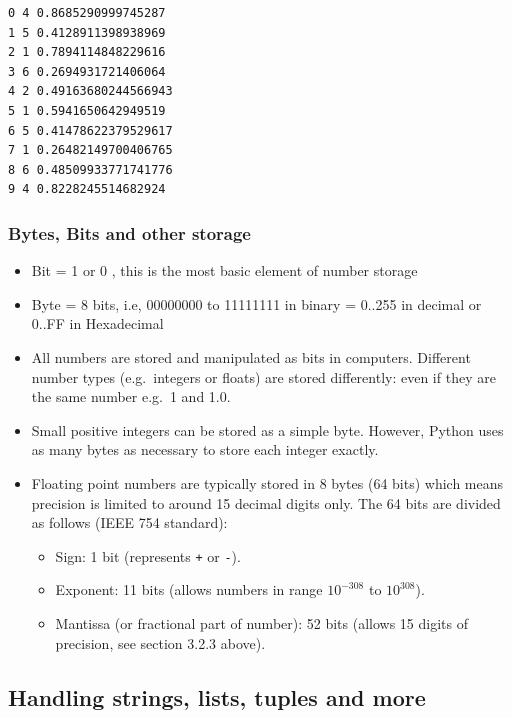 \documentclass[10pt]{article}
\providecommand{\tightlist}{%
      \setlength{\itemsep}{0pt}\setlength{\parskip}{0pt}}
\begin{document}
    \begin{Verbatim}[commandchars=\\\{\}]
0 4 0.8685290999745287
1 5 0.4128911398938969
2 1 0.7894114848229616
3 6 0.2694931721406064
4 2 0.49163680244566943
5 1 0.5941650642949519
6 5 0.41478622379529617
7 1 0.26482149700406765
8 6 0.48509933771741776
9 4 0.8228245514682924
    \end{Verbatim}

    \hypertarget{bytes-bits-and-other-storage}{%
\subsubsection{Bytes, Bits and other
storage}\label{bytes-bits-and-other-storage}}

\begin{itemize}
\tightlist
\item
  Bit = 1 or 0 , this is the most basic element of number storage
\item
  Byte = 8 bits, i.e, 00000000 to 11111111 in binary = 0..255 in decimal
  or 0..FF in Hexadecimal
\item
  All numbers are stored and manipulated as bits in computers. Different
  number types (e.g.~integers or floats) are stored differently: even if
  they are the same number e.g.~1 and 1.0.
\item
  Small positive integers can be stored as a simple byte. However,
  Python uses as many bytes as necessary to store each integer exactly.
\item
  Floating point numbers are typically stored in 8 bytes (64 bits) which
  means precision is limited to around 15 decimal digits only. The 64
  bits are divided as follows (IEEE 754 standard):

  \begin{itemize}
  \tightlist
  \item
    Sign: 1 bit (represents \texttt{+} or \texttt{-}).
  \item
    Exponent: 11 bits (allows numbers in range \(10^{-308}\) to
    \(10^{308}\)).
  \item
    Mantissa (or fractional part of number): 52 bits (allows 15 digits
    of precision, see section 3.2.3 above).
  \end{itemize}
\end{itemize}

    \hypertarget{handling-strings-lists-tuples-and-more}{%
\subsection{Handling strings, lists, tuples and
more}\label{handling-strings-lists-tuples-and-more}}
\end{document}

